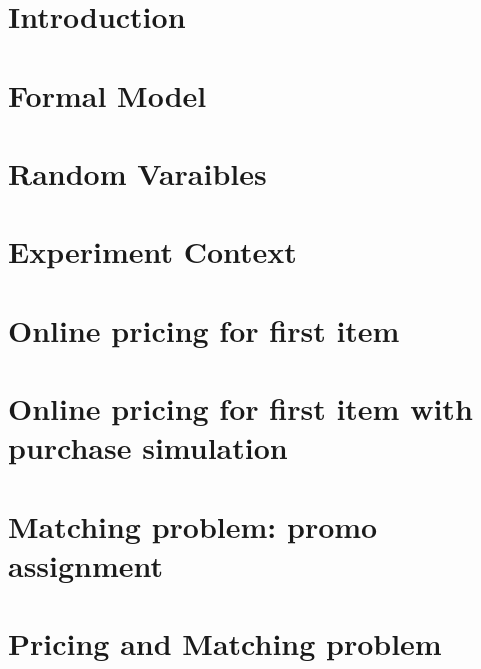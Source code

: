 

	
	\tableofcontents
    \clearpage
	\section*{Introduction}
    \label{sect:Introduction}
		
    \section*{Formal Model}
    \label{sect:Formal Model}
		
    \section*{Random Varaibles}
    \label{sect:Random Variables}
		
    \section*{Experiment Context}
    \label{sect:Experiment Context}
		
    \section*{Online pricing for first item}
    \label{sect:Online pricing for first item}
		
    \section*{Online pricing for first item with purchase simulation}
    \label{sect:Online pricing for first item with purchase simulation}
		
    \section*{Matching problem: promo assignment}
    \label{sect:Matching problem: promo assignment}
		
    \section*{Pricing and Matching problem}
    \label{sect:Pricing and Matching problem}
		
